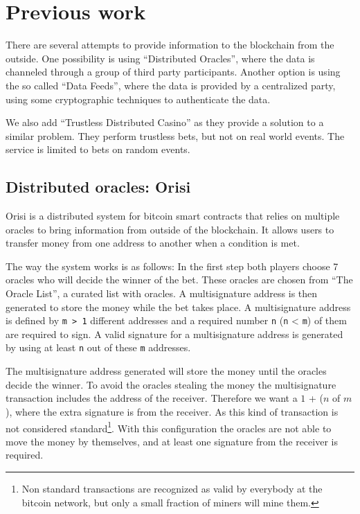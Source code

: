 \section{Previous work} \label{sec:previous_work}

There are several attempts to provide information to the blockchain from the
  outside.
One possibility is using  ``Distributed Oracles'', where the data is channeled
  through a group of third party participants.
Another option is using the so called ``Data Feeds'', where the data is provided
  by a centralized party, using some cryptographic techniques to authenticate
  the data.

We also add ``Trustless Distributed Casino'' as they provide a solution to a
  similar problem.
They perform trustless bets, but not on real world events.
The service is limited to bets on random events.

\subsection{Distributed oracles: Orisi}
Orisi \cite{orisiwhitepaper} is a distributed system for bitcoin smart
  contracts that relies on multiple oracles to bring information from outside
  of the blockchain.
It allows users to transfer money from one address to another when a condition
  is met.

The way the system works is as follows:
In the first step both players choose 7 oracles who will decide the winner of
  the bet.
These oracles are chosen from ``The Oracle List'', a curated list with oracles.
A multisignature address is then generated to store the money while the bet
  takes place.
A multisignature address is defined by \texttt{m > 1} different addresses and a
  required number \texttt{n} (\texttt{n} < \texttt{m}) of them are required to
  sign.
A valid signature for a multisignature address is generated by using at least
  \texttt{n} out of these \texttt{m} addresses.

The multisignature address generated will store the money until the oracles
  decide the winner.
To avoid the oracles stealing the money the multisignature transaction includes
  the address of the receiver.
Therefore we want a $1$ + ($n$ of $m$), where the extra signature is
  from the receiver.
As this kind of transaction is not considered
  standard\footnote{Non standard transactions are recognized as valid
  by everybody at the bitcoin network, but only a small fraction of
  miners will mine them.}.
 With this configuration the oracles are
  not able to move the money by themselves, and at least one signature
  from the receiver is required.

